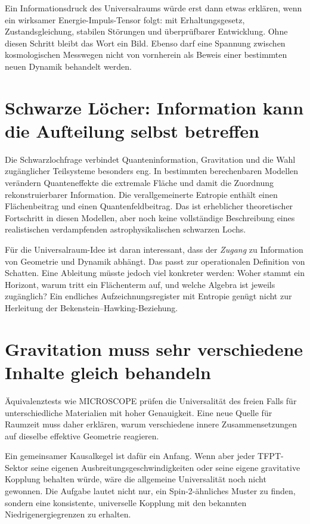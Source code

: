 Ein \glqq Informationsdruck\grqq{} des Universalraums würde erst dann etwas erklären, wenn ein wirksamer Energie-Impuls-Tensor folgt: mit Erhaltungsgesetz, Zustandsgleichung, stabilen Störungen und überprüfbarer Entwicklung. Ohne diesen Schritt bleibt das Wort ein Bild. Ebenso darf eine Spannung zwischen kosmologischen Messwegen nicht von vornherein als Beweis einer bestimmten neuen Dynamik behandelt werden.

\section{Schwarze Löcher: Information kann die Aufteilung selbst betreffen}
Die Schwarzlochfrage verbindet Quanteninformation, Gravitation und die Wahl zugänglicher Teilsysteme besonders eng. In bestimmten berechenbaren Modellen verändern Quanteneffekte die extremale Fläche und damit die Zuordnung rekonstruierbarer Information. Die verallgemeinerte Entropie enthält einen Flächenbeitrag und einen Quantenfeldbeitrag. Das ist erheblicher theoretischer Fortschritt in diesen Modellen, aber noch keine vollständige Beschreibung eines realistischen verdampfenden astrophysikalischen schwarzen Lochs. 

Für die Universalraum-Idee ist daran interessant, dass der \emph{Zugang} zu Information von Geometrie und Dynamik abhängt. Das passt zur operationalen Definition von Schatten. Eine Ableitung müsste jedoch viel konkreter werden: Woher stammt ein Horizont, warum tritt ein Flächenterm auf, und welche Algebra ist jeweils zugänglich? Ein endliches Aufzeichnungsregister mit Entropie genügt nicht zur Herleitung der Bekenstein--Hawking-Beziehung.

\section{Gravitation muss sehr verschiedene Inhalte gleich behandeln}
Äquivalenztests wie MICROSCOPE prüfen die Universalität des freien Falls für unterschiedliche Materialien mit hoher Genauigkeit. Eine neue Quelle für Raumzeit muss daher erklären, warum verschiedene innere Zusammensetzungen auf dieselbe effektive Geometrie reagieren. 

Ein gemeinsamer Kausalkegel ist dafür ein Anfang. Wenn aber jeder TFPT-Sektor seine eigenen Ausbreitungsgeschwindigkeiten oder seine eigene gravitative Kopplung behalten würde, wäre die allgemeine Universalität noch nicht gewonnen. Die Aufgabe lautet nicht nur, ein Spin-2-ähnliches Muster zu finden, sondern eine konsistente, universelle Kopplung mit den bekannten Niedrigenergiegrenzen zu erhalten.

